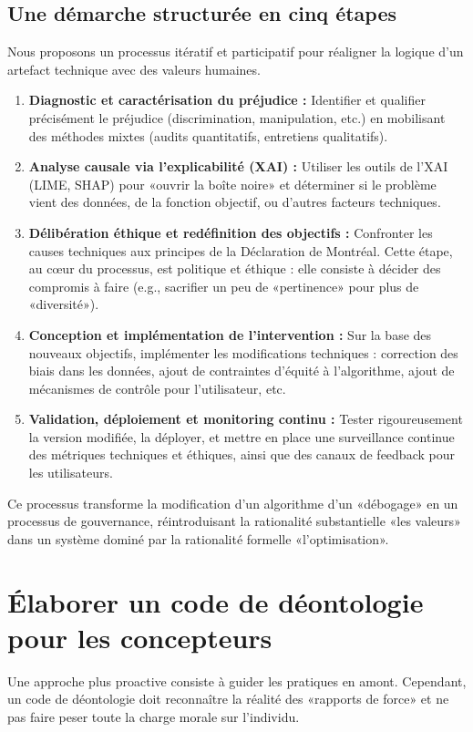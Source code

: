 \subsection{Une démarche structurée en cinq étapes}
Nous proposons un processus itératif et participatif pour réaligner la logique d'un artefact technique avec des valeurs humaines.
\begin{enumerate}
    \item \textbf{Diagnostic et caractérisation du préjudice :} Identifier et qualifier précisément le préjudice (discrimination, manipulation, etc.) en mobilisant des méthodes mixtes (audits quantitatifs, entretiens qualitatifs).
    \item \textbf{Analyse causale via l'explicabilité (XAI) :} Utiliser les outils de l'XAI (LIME, SHAP) pour «ouvrir la boîte noire» et déterminer si le problème vient des données, de la fonction objectif, ou d'autres facteurs techniques.
    \item \textbf{Délibération éthique et redéfinition des objectifs :} Confronter les causes techniques aux principes de la Déclaration de Montréal. Cette étape, au cœur du processus, est politique et éthique : elle consiste à décider des compromis à faire (e.g., sacrifier un peu de «pertinence» pour plus de «diversité»).
    \item \textbf{Conception et implémentation de l'intervention :} Sur la base des nouveaux objectifs, implémenter les modifications techniques : correction des biais dans les données, ajout de contraintes d'équité à l'algorithme, ajout de mécanismes de contrôle pour l'utilisateur, etc.
    \item \textbf{Validation, déploiement et monitoring continu :} Tester rigoureusement la version modifiée, la déployer, et mettre en place une surveillance continue des métriques techniques et éthiques, ainsi que des canaux de feedback pour les utilisateurs.
\end{enumerate}

Ce processus transforme la modification d'un algorithme d'un «débogage» en un processus de gouvernance, réintroduisant la rationalité substantielle «les valeurs» dans un système dominé par la rationalité formelle «l'optimisation».

\section{Élaborer un code de déontologie pour les concepteurs}
Une approche plus proactive consiste à guider les pratiques en amont. Cependant, un code de déontologie doit reconnaître la réalité des «rapports de force» et ne pas faire peser toute la charge morale sur l'individu.


